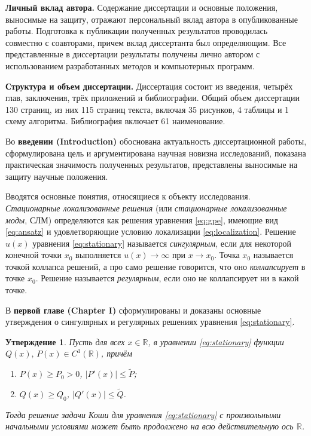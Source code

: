 \documentclass[candidate, href, colorlinks]{disser}
\newtheorem{proposition}{Утверждение}
\begin{document}
\textbf{Личный вклад автора.}
Содержание диссертации и основные положения, выносимые на защиту, отражают персональный вклад автора в опубликованные работы.
Подготовка к публикации полученных результатов проводилась совместно с соавторами, причем вклад диссертанта был определяющим.
Все представленные в диссертации результаты получены лично автором с использованием разработанных методов и компьютерных программ.

\textbf{Структура и объем диссертации.}
Диссертация состоит из введения, четырёх глав, заключения, трёх приложений и библиографии.
Общий объем диссертации 130 страниц, из них 115 страниц текста, включая 35 рисунков, 4 таблицы и 1 схему алгоритма.
Библиография включает 61 наименование.


Во \textbf{введении (Introduction)} обоснована актуальность диссертационной работы, сформулирована цель и аргументирована научная новизна исследований, показана практическая значимость полученных результатов, представлены выносимые на защиту научные положения.

Вводятся основные понятия, относящиеся к объекту исследования.
{\it Стационарные локализованные решения} (или {\it стационарные локализованные моды}, СЛМ) определяются как решения уравнения \eqref{eq:gpe}, имеющие вид \eqref{eq:ansatz} и удовлетворяющие условию локализации \eqref{eq:localization}.
Решение $u(x)$ уравнения \eqref{eq:stationary} называется {\it сингулярным}, если для некоторой конечной точки $x_0$ выполняется $u(x) \to \infty$ при $x \to x_0$.
Точка $x_0$ называется точкой коллапса решений, а про само решение говорится, что оно {\it коллапсирует} в точке $x_0$.
Решение называется {\it регулярным}, если оно не коллапсирует ни в какой точке.

В \textbf{первой главе (Chapter I)} сформулированы и доказаны основные утверждения о сингулярных и регулярных решениях уравнения \eqref{eq:stationary}.

\begin{proposition}
\label{prop:absense-of-singular-solutions}
	Пусть для всех $x \in \mathbb{R}$, в уравнении \eqref{eq:stationary} функции $Q(x), \, P(x) \in C^1(\mathbb{R})$, причём
	\begin{enumerate}
		\item[(a)] $P(x) \ge P_0 > 0$, $|P'(x)| \le \widetilde{P}$;
		\item[(б)] $Q(x) \ge Q_0$, $|Q'(x)| \le \widetilde{Q}$.
	\end{enumerate}
	Тогда решение задачи Коши для уравнения \eqref{eq:stationary} с произвольными начальными условиями может быть продолжено на всю действительную ось $\mathbb{R}$.
\end{proposition}
\end{document}
